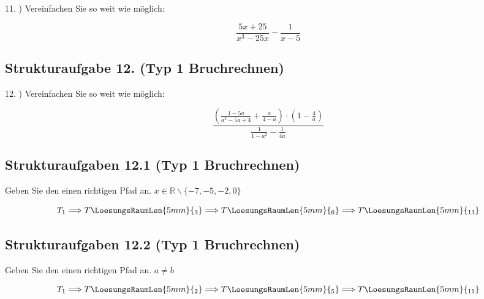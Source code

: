 11. ) Vereinfachen Sie so weit wie möglich:

$$\frac{5x+25}{x^3-25x} - \frac1{x-5}$$


\subsection*{Strukturaufgabe 12. (Typ 1 Bruchrechnen)}

12. ) Vereinfachen Sie so weit wie möglich:

$$\frac{\left( \frac{1-5a}{a^2-5a+4} + \frac{a}{4-a} \right)  \cdot{} \left( 1-\frac4a \right)}{\frac1{1-a^2} - \frac1{4a}}$$


\newpage
\subsection*{Strukturaufgaben 12.1 (Typ 1 Bruchrechnen)}


Geben Sie den einen richtigen Pfad
an. $x \in \mathbb{R}\backslash \{ -7, -5, -2, 0\}$


$$T_1 \Longrightarrow T\LoesungsRaumLen{5mm}{{}_3} \Longrightarrow
T\LoesungsRaumLen{5mm}{{}_6} \Longrightarrow T\LoesungsRaumLen{5mm}{{}_{13}}$$
\newpage
\subsection*{Strukturaufgaben 12.2 (Typ 1 Bruchrechnen)}


Geben Sie den einen richtigen Pfad
an. $a \ne b$


$$T_1 \Longrightarrow T\LoesungsRaumLen{5mm}{{}_2} \Longrightarrow
T\LoesungsRaumLen{5mm}{{}_5} \Longrightarrow T\LoesungsRaumLen{5mm}{{}_{11}}$$



